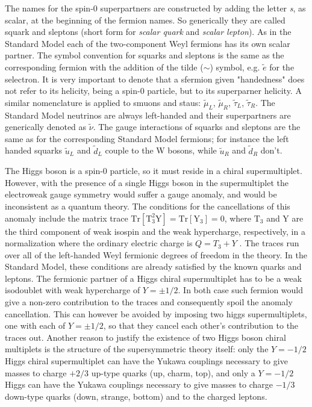 The names for the spin-0 superpartners are constructed by adding the letter \textit{s}, as scalar, at the beginning of the fermion names. So generically they are called squark and sleptons (short form for \textit{scalar quark} and \textit{scalar lepton}). As in the Standard Model each of the two-component Weyl fermions has its own scalar partner. The symbol convention for squarks and sleptons is the same as the corresponding fermion with the addition of the tilde ($\sim$) symbol, e.g. $\widetilde{e}$ for the selectron. It is very important to denote that a sfermion given "handedness" does not refer to its helicity, being a spin-0 particle, but to its superparner helicity. A similar nomenclature is applied to smuons and staus: $\widetilde{\mu}_{L}$, $\widetilde{\mu}_{R}$, $\widetilde{\tau}_{L}$, $\widetilde{\tau}_{R}$. The Standard Model neutrinos are always left-handed and their superpartners are generically denoted as $\widetilde{\nu}$. The gauge interactions of squarks and sleptons are the same as for the corresponding Standard Model fermions; for instance the left handed squarks $\widetilde{u}_{L}$ and $\widetilde{d}_{L}$ couple to the W bosons, while $\widetilde{u}_{R}$ and $\widetilde{d}_{R}$ don't.

The Higgs boson is a spin-0 particle, so it must reside in a chiral supermultiplet. However, with the presence of a single Higgs boson in the supermultiplet the electroweak gauge symmetry would suffer a gauge anomaly, and would be inconsistent as a quantum theory. The conditions for the cancellations of this anomaly include the matrix trace $\text{Tr}[\text{T}^{2}_{3}\text{Y}] = \text{Tr}[\text{Y}_{3}] = 0$, where $\text{T}_{3}$ and Y are the third component of weak isospin and the weak hypercharge, respectively, in a normalization where the ordinary electric charge is $Q = T_{3} + Y$ . The traces run over all of the left-handed Weyl fermionic degrees of freedom in the theory. In the Standard Model, these conditions are already satisfied by the known quarks and leptons. The fermionic partner of a Higgs chiral supermultiplet has to be a weak isodoublet with weak hypercharge of $Y = \pm 1/2$. In both case such fermion would give a non-zero contribution to the traces and consequently spoil the anomaly cancellation. This can however be avoided by imposing two higgs supermultiplets, one with each of $Y = \pm1/2$, so that they cancel each other's contribution to the traces out. Another reason to justify the existence of two Higgs boson chiral multiplets is the structure of the supersymmetric theory itself: only the $Y = -1/2$ Higgs chiral supermultiplet can have the Yukawa couplings necessary to give masses to charge $+2/3$ up-type quarks (up, charm, top), and only a $Y = -1/2$ Higgs can have the Yukawa couplings necessary to give masses to charge $-1/3$ down-type quarks (down, strange, bottom) and to the charged leptons. 

